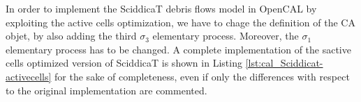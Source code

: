 In order to implement the SciddicaT debris flows model in OpenCAL by
exploiting the active cells optimization, we have to chage the
definition of the CA objet, by also adding the third $\sigma_3$
elementary process. Moreover, the $\sigma_1$ elementary process has to
be changed. A complete implementation of the sactive cells optimized
version of SciddicaT is shown in Listing
\ref{lst:cal_Sciddicat-activecells} for the sake of completeness, even
if only the differences with respect to the original implementation
are commented.










